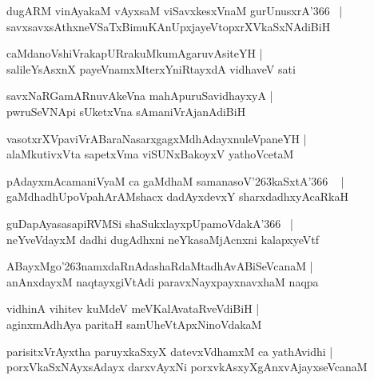 \documentclass[twoside,12pt,openright]{book}
\def\S{\char'263}
\newcounter{shloka}[chapter]
\begin{document}
\begin{shloka}%
dugARM vinAyakaM vAyxsaM viSavxkesxVnaM gurUnusxrA\char'366 ~|\\
savxsavxsAthxneVSaTxBimuKAnUpxjayeVtopxrXVkaSxNAdiBiH 
\end{shloka}

\begin{shloka}%
caMdanoVshiVrakapURrakuMkumAgaruvAsiteYH |\\
salileYsAsxnX payeVnamxMterxYniRtayxdA vidhaveV sati 
\end{shloka}

\begin{shloka}%
savxNaRGamARnuvAkeVna mahApuruSavidhayxyA |\\
pwruSeVNApi sUketxVna sAmaniVrAjanAdiBiH 
\end{shloka}

\begin{shloka}%
vasotxrXVpaviVrABaraNasarxgagxMdhAdayxnuleVpaneYH |\\
alaMkutivxVta sapetxVma viSUNxBakoyxV yathoVcetaM
\end{shloka}

\begin{shloka}%
pAdayxmAcamaniVyaM ca gaMdhaM samanasoV\S kaSxtA\char'366 ~ |\\
gaMdhadhUpoVpahArAMshacx dadAyxdevxY sharxdadhxyAcaRkaH 
\end{shloka}

\begin{shloka}%
guDapAyasasapiRVMSi shaSukxlayxpUpamoVdakA\char'366 ~|\\
neYveVdayxM dadhi dugAdhxni neYkasaMjAcnxni kalapxyeVtf
\end{shloka}

\begin{shloka}%
ABayxMgo\S namxdaRnAdashaRdaMtadhAvABiSeVcanaM |\\
anAnxdayxM naqtayxgiVtAdi paravxNayxpayxnavxhaM naqpa 
\end{shloka}

\begin{shloka}%
vidhinA vihitev kuMdeV meVKalAvataRveVdiBiH |\\
aginxmAdhAya paritaH samUheVtApxNinoVdakaM
\end{shloka}

\begin{shloka}%
parisitxVrAyxtha paruyxkaSxyX datevxVdhamxM ca yathAvidhi |\\
porxVkaSxNAyxsAdayx darxvAyxNi porxvkAsxyXgAnxvAjayxseVcanaM 
\end{shloka}
\end{document}
